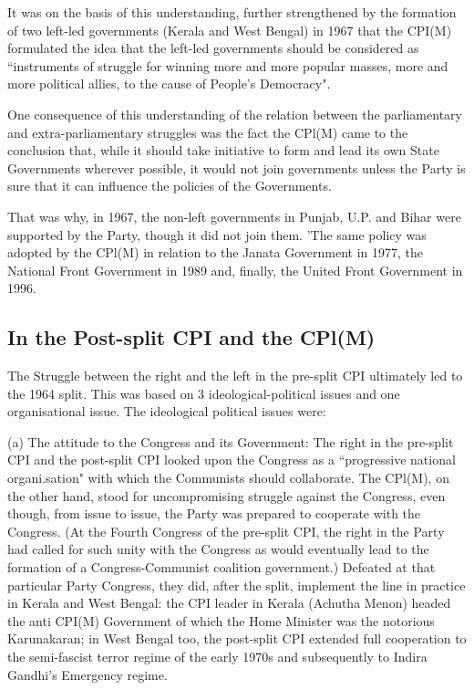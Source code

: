 It was on the basis of this understanding, further strengthened by the formation of two left-led governments (Kerala and West Bengal) in 1967 that the CPI(M) formulated the idea that the left-led governments should be considered as “instruments of struggle for winning more and more popular masses, more and more political allies, to the cause of People’s Democracy". 

One consequence of this understanding of the relation between the parliamentary and extra-parliamentary struggles was the fact the CPl(M) came to the conclusion that, while it should take initiative to form and lead its own State Governments wherever possible, it would not join governments unless the Party is sure that it can influence the policies of the Governments. 

That was why, in 1967, the non-left governments in Punjab, U.P. and Bihar were supported by the Party, though it did not join them. 'The same policy was adopted by the CPl(M) in relation to the Janata Government in 1977, the National Front Government in 1989 and, finally, the United Front Government in 1996. 

\subsection{In the Post-split CPI and the CPl(M)}

The Struggle between the right and the left in the pre-split CPI ultimately led to the 1964 split. This was based on 3 ideological-political issues and one organisational issue. The ideological political issues were: 

(a) The attitude to the Congress and its Government: The right in the pre-split CPI and the post-split CPI looked upon the Congress as a “progressive national organi.sation" with which the Communists should collaborate. The CPl(M), on the other hand, stood for uncompromising struggle against the Congress, even though, from issue to issue, the Party was prepared to cooperate with the Congress. (At the Fourth Congress of the pre-split CPI, the right in the Party had called for such unity with the Congress as would eventually lead to the formation of a Congress-Communist coalition government.) Defeated at that particular Party Congress, they did, after the split, implement the line in practice in Kerala and West Bengal: the CPI leader in Kerala (Achutha Menon) headed the anti CPI(M) Government of which the Home Minister was the notorious Karunakaran; in West Bengal too, the post-split CPI extended full cooperation to the semi-fascist terror regime of the early 1970s and subsequently to Indira Gandhi’s Emergency regime. 

